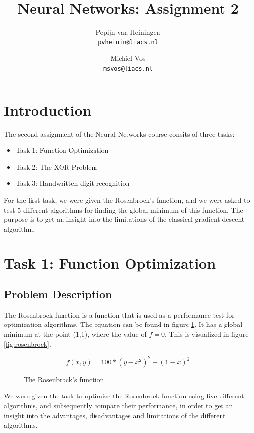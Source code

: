 \documentclass{article}
\title{Neural Networks: Assignment 2}
\author{Pepijn van Heiningen \\ \texttt{pvheinin@liacs.nl} \and Michiel Vos \\ \texttt{msvos@liacs.nl}}
\begin{document}
\maketitle

\section{Introduction}
The second assignment of the Neural Networks course consits of three tasks:\\
\begin{itemize}
\item Task 1: Function Optimization
\item Task 2: The XOR Problem
\item Task 3: Handwritten digit recognition
\end{itemize}

For the first task, we were given the Rosenbrock's function, and we were asked to test 5 different algorithms for finding the global minimum of this function. The purpose is to get an insight into the limitations of the classical gradient descent algorithm. 



\newpage
\section{Task 1: Function Optimization}
\subsection{Problem Description}
The Rosenbrock function is a function that is used as a performance test for optimization algorithms. The equation can be found in figure \ref{eq:rosen}. It has a global minimum at the point (1,1), where the value of $f = 0$. This is visualized in figure \ref{fig:rosenbrock}. \\

\begin{figure}[H]
\[f(x,y) = 100 * (y-x^2)^2 + (1 - x)^2\]
\caption{The Rosenbrock's function}
\label{eq:rosen}
\end{figure}

We were given the task to optimize the Rosenbrock function using five different algorithms, and subsequently compare their performance, in order to get an insight into the advantages, disadvantages and limitations of the different algorithms.\\
\end{document}
